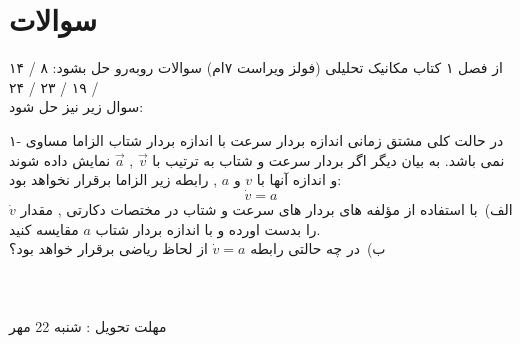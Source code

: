 \documentclass{article}
\begin{document}
\noindent
\section*{سوالات}
از فصل ۱ کتاب مکانیک تحلیلی (فولز ویراست ۷ام) سوالات روبه‌رو حل بشود:
۸ / ۱۴ / ۱۹ / ۲۳ / ۲۴
\\

\noindent
{\large سوال زیر نیز حل شود:}

\noindent
۱-
در حالت کلی مشتق زمانی اندازه بردار سرعت با اندازه بردار شتاب الزاما مساوی نمی باشد. به بیان دیگر اگر بردار سرعت و شتاب به ترتیب با $\vec{v}$ , $\vec{a}$ نمایش داده شوند و اندازه آنها با $v$ و $a$ , رابطه زیر الزاما برقرار نخواهد بود:
$$ \dot{v} = a $$
الف)\ با استفاده از مؤلفه های بردار های سرعت و شتاب در مختصات دکارتی , مقدار $\dot{v}$ را بدست اورده و با اندازه بردار شتاب $a$ مقایسه کنید. \\
ب)\ در چه حالتی رابطه $ \dot{v} = a $ از لحاظ ریاضی برقرار خواهد بود؟ \\
~\\
~\\
~\\
مهلت تحویل : شنبه 22 مهر
\end{document}
